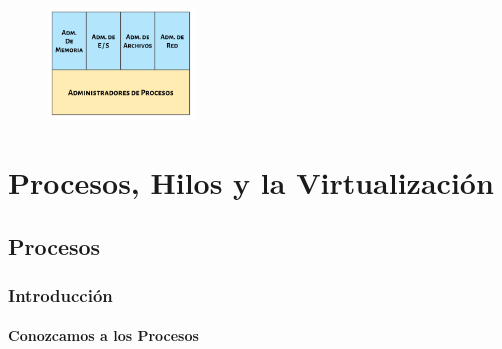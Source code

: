 \documentclass[12pt, fleqn]{report}                             %
\begin{document}
            \begin{figure}[h!]
                \centering
                \includegraphics[width=0.35\textwidth]{PartesDelKernel}
            \end{figure}





\part{Procesos, Hilos y la Virtualización}
\clearpage


    \chapter{Procesos}

        \clearpage
        \section{Introducción}

            \clearpage
            \subsection{Conozcamos a los Procesos}
\end{document}
